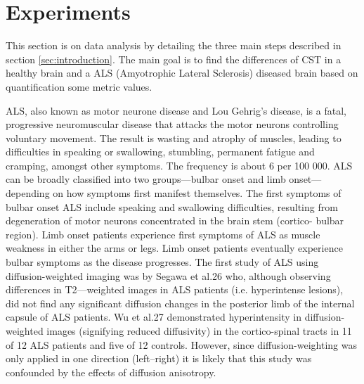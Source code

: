 \section{Experiments}
\label{sec:experiments}
This section is on data analysis by detailing the three main steps described in section \ref{sec:introduction}. The main goal is to find the differences of CST in a healthy brain and a ALS (Amyotrophic Lateral Sclerosis) diseased brain based on quantification some metric values. 

ALS, also known as motor
neurone disease and Lou Gehrig’s disease, is a fatal,
progressive neuromuscular disease that attacks the motor
neurons controlling voluntary movement. The result is
wasting and atrophy of muscles, leading to difficulties in
speaking or swallowing, stumbling, permanent fatigue
and cramping, amongst other symptoms. The frequency
is about 6 per 100 000. ALS can be broadly classified into
two groups—bulbar onset and limb onset—depending on
how symptoms first manifest themselves. The first
symptoms of bulbar onset ALS include speaking and
swallowing difficulties, resulting from degeneration of
motor neurons concentrated in the brain stem (cortico-
bulbar region). Limb onset patients experience first
symptoms of ALS as muscle weakness in either the arms
or legs. Limb onset patients eventually experience bulbar
symptoms as the disease progresses.
The first study of ALS using diffusion-weighted
imaging was by Segawa et al.26 who, although observing
differences in T2—weighted images in ALS patients (i.e.
hyperintense lesions), did not find any significant
diffusion changes in the posterior limb of the internal
capsule of ALS patients. Wu et al.27 demonstrated
hyperintensity in diffusion-weighted images (signifying
reduced diffusivity) in the cortico-spinal tracts in 11 of 12
ALS patients and five of 12 controls. However, since
diffusion-weighting was only applied in one direction
(left–right) it is likely that this study was confounded by
the effects of diffusion anisotropy.~\cite{horsfield2002applications}









